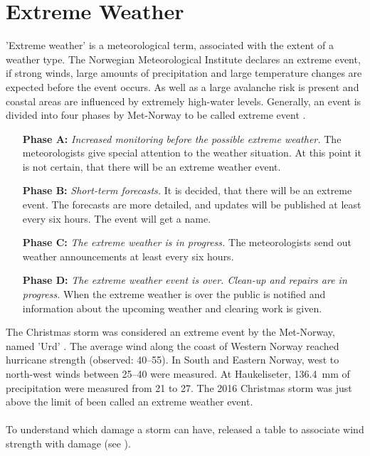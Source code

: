 \section{Extreme Weather}
'Extreme weather' is a meteorological term, associated with the extent of a weather type. The Norwegian Meteorological Institute declares an extreme event, if strong winds, large amounts of precipitation and large temperature changes are expected before the event occurs. As well as a large avalanche risk is present and coastal areas are influenced by extremely high-water levels. 
Generally, an event is divided into four phases by Met-Norway to be called extreme event \citep{pedersen_hva_2013}. 
\begin{itemize}
	\setlength\itemsep{-.85em}
	\item[\textbf{Phase A:}] \textit{Increased monitoring before the possible extreme weather.} The meteorologists give special attention to the weather situation. At this point it is not certain, that there will be an extreme weather event.
	\item[\textbf{Phase B:}] \textit{Short-term forecasts.} It is decided, that there will be an extreme event. The forecasts are more detailed, and updates will be published at least every six hours. The event will get a name.
	\item[\textbf{Phase C:}] \textit{The extreme weather is in progress.} The meteorologists send out weather announcements at least every six hours.
	\item[\textbf{Phase D:}] \textit{The extreme weather event is over. Clean-up and repairs are in progress.} When the extreme weather is over the public is notified and information about the upcoming weather and clearing work is given.
\end{itemize}
The Christmas storm was considered an extreme event by the Met-Norway, named 'Urd'
\citep{olsen_ekstremvaerrapport._2017}. 
The average wind along the coast of Western Norway reached hurricane strength (observed: \SIrange{40}{55}{\mPs}). In South and Eastern Norway, west to north-west winds between \SIrange{25}{40}{\mPs} were measured.
At Haukeliseter, \SI{136.4}{\milli\metre} of precipitation were measured from \num{21} to \SI{27}{\dec}.
The 2016 Christmas storm was just above the limit of been called an extreme weather event.
\\
\\
To understand which damage a storm can have, \cite{faeraas_urd_2016} released a table to associate wind strength with damage (see ).




